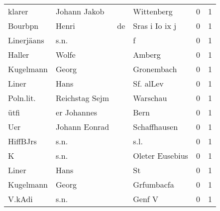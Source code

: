 \begin{tabular}{llllrr}
                   klarer &                       Johann Jakob &             &                                  Wittenberg &          0 &         1 \\
                  Bourbpn &                              Henri &          de &                              Sras i Io ix j &          0 &         1 \\
               Linerjäans &                               s.n. &             &                                           f &          0 &         1 \\
                   Haller &                              Wolfe &             &                                      Amberg &          0 &         1 \\
                Kugelmann &                              Georg &             &                                  Gronembach &          0 &         1 \\
                    Liner &                               Hans &             &                                   Sf. alLev &          0 &         1 \\
                Poln.lit. &                     Reichstag Sejm &             &                                    Warschau &          0 &         1 \\
                     ütfi &                        er Johannes &             &                                        Bern &          0 &         1 \\
                      Uer &                      Johann Eonrad &             &                                Schaffhausen &          0 &         1 \\
                 HiffBJrs &                               s.n. &             &                                        s.l. &          0 &         1 \\
                        K &                               s.n. &             &                             Oleter Eusebius &          0 &         1 \\
                    Liner &                               Hans &             &                                          St &          0 &         1 \\
                Kugelmann &                              Georg &             &                                  Grfumbacfa &          0 &         1 \\
                   V.kAdi &                               s.n. &             &                                      Genf V &          0 &         1 \\

\end{tabular}
